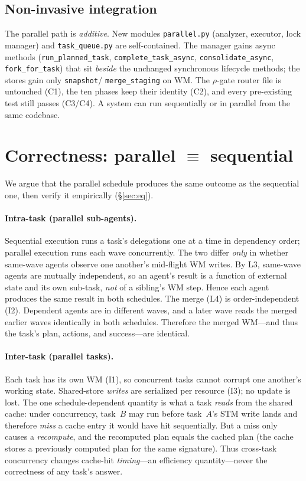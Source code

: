 \documentclass[10pt,twocolumn]{article}
\newcommand{\code}[1]{\texttt{\small #1}}
\begin{document}
\subsection{Non-invasive integration}\label{sec:integration}
The parallel path is \emph{additive}. New modules \code{parallel.py} (analyzer,
executor, lock manager) and \code{task\_queue.py} are self-contained. The manager
gains async methods (\code{run\_planned\_task}, \code{complete\_task\_async},
\code{consolidate\_async}, \code{fork\_for\_task}) that sit \emph{beside} the
unchanged synchronous lifecycle methods; the stores gain only \code{snapshot}/
\code{merge\_staging} on WM. The $\rho$-gate router file is untouched (C1), the ten
phases keep their identity (C2), and every pre-existing test still passes (C3/C4).
A system can run sequentially or in parallel from the same codebase.

\section{Correctness: parallel $\equiv$ sequential}\label{sec:correct}
We argue that the parallel schedule produces the same outcome as the sequential
one, then verify it empirically (\S\ref{sec:eq}).

\paragraph{Intra-task (parallel sub-agents).} Sequential execution runs a task's
delegations one at a time in dependency order; parallel execution runs each wave
concurrently. The two differ \emph{only} in whether same-wave agents observe one
another's mid-flight WM writes. By L3, same-wave agents are mutually independent,
so an agent's result is a function of external state and its own sub-task,
\emph{not} of a sibling's WM step. Hence each agent produces the same result in
both schedules. The merge (L4) is order-independent (\textsc{I2}). Dependent agents
are in different waves, and a later wave reads the merged earlier waves identically
in both schedules. Therefore the merged WM---and thus the task's plan, actions, and
success---are identical.

\paragraph{Inter-task (parallel tasks).} Each task has its own WM (\textsc{I1}), so
concurrent tasks cannot corrupt one another's working state. Shared-store
\emph{writes} are serialized per resource (\textsc{I3}); no update is lost. The one
schedule-dependent quantity is what a task \emph{reads} from the shared cache:
under concurrency, task~$B$ may run before task~$A$'s STM write lands and therefore
\emph{miss} a cache entry it would have hit sequentially. But a miss only causes a
\emph{recompute}, and the recomputed plan equals the cached plan (the cache stores
a previously computed plan for the same signature). Thus cross-task concurrency
changes cache-hit \emph{timing}---an efficiency quantity---never the correctness of
any task's answer.
\end{document}

